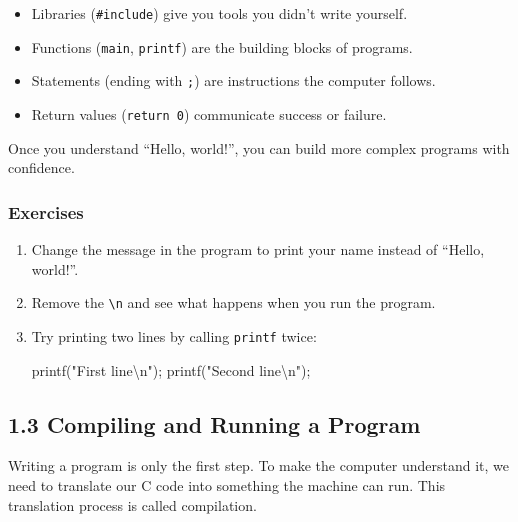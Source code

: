 \documentclass[
  letterpaper,
  DIV=11,
  numbers=noendperiod]{scrreprt}
\newenvironment{Shaded}{\begin{snugshade}}{\end{snugshade}}
\newcommand{\NormalTok}[1]{\textcolor[rgb]{0.00,0.23,0.31}{#1}}
\newcommand{\OperatorTok}[1]{\textcolor[rgb]{0.37,0.37,0.37}{#1}}
\newcommand{\SpecialCharTok}[1]{\textcolor[rgb]{0.37,0.37,0.37}{#1}}
\newcommand{\StringTok}[1]{\textcolor[rgb]{0.13,0.47,0.30}{#1}}
\providecommand{\tightlist}{%
  \setlength{\itemsep}{0pt}\setlength{\parskip}{0pt}}
\begin{document}
\begin{itemize}
\tightlist
\item
  Libraries (\texttt{\#include}) give you tools you didn't write
  yourself.
\item
  Functions (\texttt{main}, \texttt{printf}) are the building blocks of
  programs.
\item
  Statements (ending with \texttt{;}) are instructions the computer
  follows.
\item
  Return values (\texttt{return\ 0}) communicate success or failure.
\end{itemize}

Once you understand ``Hello, world!'', you can build more complex
programs with confidence.

\subsubsection{Exercises}\label{exercises-1}

\begin{enumerate}
\def\labelenumi{\arabic{enumi}.}
\item
  Change the message in the program to print your name instead of
  ``Hello, world!''.
\item
  Remove the \texttt{\textbackslash{}n} and see what happens when you
  run the program.
\item
  Try printing two lines by calling \texttt{printf} twice:

\begin{Shaded}
\begin{Highlighting}[]
\NormalTok{printf}\OperatorTok{(}\StringTok{"First line}\SpecialCharTok{\textbackslash{}n}\StringTok{"}\OperatorTok{);}
\NormalTok{printf}\OperatorTok{(}\StringTok{"Second line}\SpecialCharTok{\textbackslash{}n}\StringTok{"}\OperatorTok{);}
\end{Highlighting}
\end{Shaded}
\end{enumerate}

\subsection{1.3 Compiling and Running a
Program}\label{compiling-and-running-a-program}

Writing a program is only the first step. To make the computer
understand it, we need to translate our C code into something the
machine can run. This translation process is called compilation.
\end{document}
